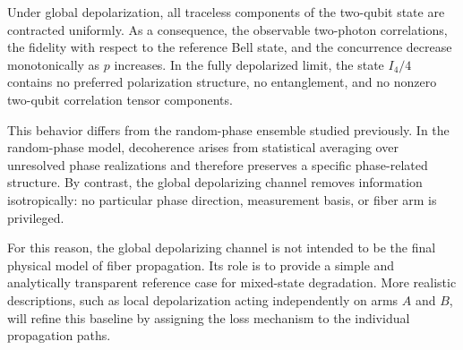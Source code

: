 \medskip

Under global depolarization, all traceless components of the two-qubit state are contracted uniformly. As a consequence, the observable two-photon correlations, the fidelity with respect to the reference Bell state, and the concurrence decrease monotonically as \( p \) increases. In the fully depolarized limit, the state \( I_4/4 \) contains no preferred polarization structure, no entanglement, and no nonzero two-qubit correlation tensor components.

\medskip

This behavior differs from the random-phase ensemble studied previously. In the random-phase model, decoherence arises from statistical averaging over unresolved phase realizations and therefore preserves a specific phase-related structure. By contrast, the global depolarizing channel removes information isotropically: no particular phase direction, measurement basis, or fiber arm is privileged.

\medskip

For this reason, the global depolarizing channel is not intended to be the final physical model of fiber propagation. Its role is to provide a simple and analytically transparent reference case for mixed-state degradation. More realistic descriptions, such as local depolarization acting independently on arms \( A \) and \( B \), will refine this baseline by assigning the loss mechanism to the individual propagation paths.